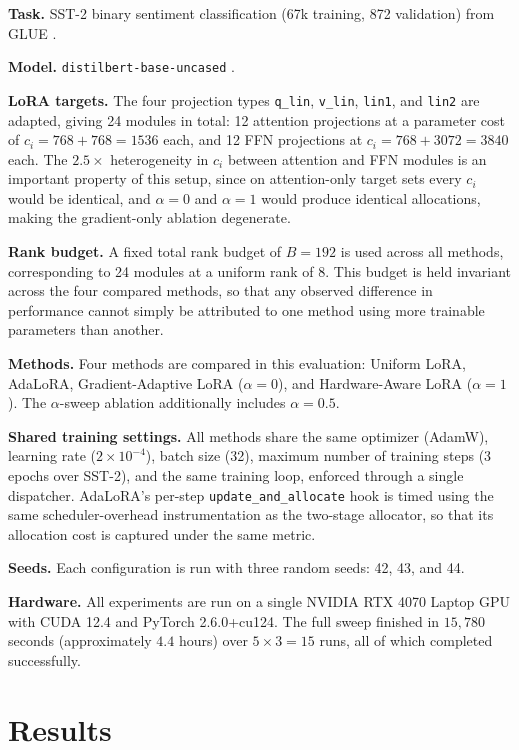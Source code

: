 \documentclass{article}
\begin{document}
\textbf{Task.} SST-2 binary sentiment classification (67k training,
872 validation) from GLUE \cite{wang2018glue, socher2013sst}.

\textbf{Model.} \texttt{distilbert-base-uncased}
\cite{sanh2019distilbert}.

\textbf{LoRA targets.} The four projection types \texttt{q\_lin},
\texttt{v\_lin}, \texttt{lin1}, and \texttt{lin2} are adapted, giving
24 modules in total: 12 attention projections at a parameter cost of
$c_i = 768 + 768 = 1536$ each, and 12 FFN projections at
$c_i = 768 + 3072 = 3840$ each. The $2.5\times$ heterogeneity in $c_i$
between attention and FFN modules is an important property of this
setup, since on attention-only target sets every $c_i$ would be
identical, and $\alpha = 0$ and $\alpha = 1$ would produce identical
allocations, making the gradient-only ablation degenerate.

\textbf{Rank budget.} A fixed total rank budget of $B = 192$ is used
across all methods, corresponding to 24 modules at a uniform rank of
8. This budget is held invariant across the four compared methods, so
that any observed difference in performance cannot simply be
attributed to one method using more trainable parameters than another.

\textbf{Methods.} Four methods are compared in this evaluation:
Uniform LoRA, AdaLoRA, Gradient-Adaptive LoRA ($\alpha = 0$), and
Hardware-Aware LoRA ($\alpha = 1$). The $\alpha$-sweep ablation
additionally includes $\alpha = 0.5$.

\textbf{Shared training settings.} All methods share the same
optimizer (AdamW), learning rate ($2 \times 10^{-4}$), batch size
(32), maximum number of training steps (3 epochs over SST-2), and the
same training loop, enforced through a single dispatcher. AdaLoRA's
per-step \texttt{update\_and\_allocate} hook is timed using the same
scheduler-overhead instrumentation as the two-stage allocator, so
that its allocation cost is captured under the same metric.

\textbf{Seeds.} Each configuration is run with three random seeds:
42, 43, and 44.

\textbf{Hardware.} All experiments are run on a single NVIDIA RTX
4070 Laptop GPU with CUDA 12.4 and PyTorch 2.6.0+cu124. The full
sweep finished in $15{,}780$ seconds (approximately $4.4$ hours) over
$5 \times 3 = 15$ runs, all of which completed successfully.

\section{Results}
\label{sec:results}
\end{document}
